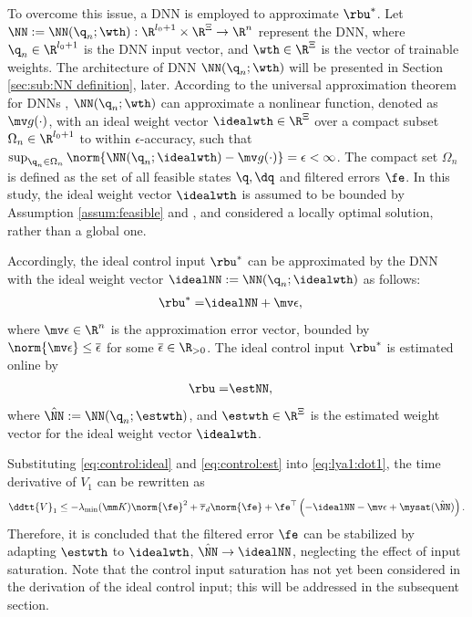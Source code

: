 \documentclass[letterpaper, journal]{IEEEtran}
\begin{document}
To overcome this issue, a DNN is employed to approximate $\rbu^*$.
Let $\NN:=\NN({\q}_n;\wth): \R^{l_0+1}\times\R^{\Xi}\to\R^{n}$ represent the DNN, where ${\q}_n\in\R^{l_0+1}$ is the DNN input vector, and $\wth\in\R^{\Xi}$ is the vector of trainable weights.
The architecture of DNN $\NN({\q}_n;\wth)$ will be presented in Section \ref{sec:sub:NN definition}, later.
According to the universal approximation theorem for DNNs \cite{Kidger:2020aa}, $\NN({\q}_n;\wth)$ can approximate a nonlinear function, denoted as $\mv g(\cdot)$, with an ideal weight vector $\idealwth\in\R^\Xi$ over a compact subset $\Omega_{n}\in\R^{l_0+1}$ to within $\epsilon$-accuracy, such that $\sup_{{\q}_n\in\Omega_{n}}\norm{ \NN({\q}_n;\idealwth) - \mv g(\cdot)} = \epsilon < \infty$.
The compact set $\Omega_{n}$ is defined as the set of all feasible states $\q,\dq$ and filtered errors $\fe$.
In this study, the ideal weight vector $\idealwth$ is assumed to be bounded by Assumption \ref{assum:feasible} and \cite[Assum. 1]{Lewis:1996aa}, and considered a locally optimal solution, rather than a global one.

Accordingly, the ideal control input $\rbu^*$ can be approximated by the DNN with the ideal weight vector $\idealNN:=\NN({\q}_n;\idealwth)$ as follows:
\begin{align}
    \rbu^*=& \idealNN+\mv\epsilon
    ,
    \label{eq:control:ideal}
\end{align}
where $\mv\epsilon\in\R^n$ is the approximation error vector, bounded by $\norm{\mv\epsilon}\le \overline{\epsilon}$ for some $\overline{\epsilon}\in\R_{>0}$.
The ideal control input $\rbu^*$ is estimated online by
\begin{align}
    \rbu =& \estNN,
    \label{eq:control:est}
\end{align}
where $\hat\NN:=\NN({\q}_n;\estwth)$, and $\estwth\in\R^\Xi$ is the estimated weight vector for the ideal weight vector $\idealwth$.

Substituting \eqref{eq:control:ideal} and \eqref{eq:control:est} into \eqref{eq:lya1:dot1}, the time derivative of $V_1$ can be rewritten as
\begin{equation}
    \ddtt{V}_1
    \le 
    -\lambda_{\min}(\mm K)\norm{\fe}^2
    +
    \overline\tau_d\norm{\fe}
    +
    \fe^\top 
    \left(
        -\idealNN
        -\mv\epsilon
        +\mysat(\hat\NN)
    \right)
    .
    \label{eq:lya1:dot2}
\end{equation}
Therefore, it is concluded that the filtered error $\fe$ can be stabilized by adapting $\estwth$ to $\idealwth$, \ie $\hat\NN\to\idealNN$, neglecting the effect of input saturation.
Note that the control input saturation has not yet been considered in the derivation of the ideal control input; this will be addressed in the subsequent section.
\end{document}
